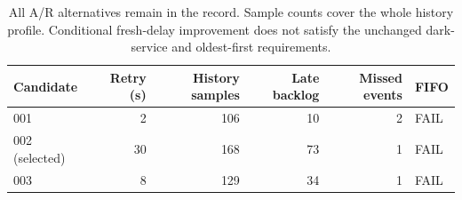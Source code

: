 \begin{table}[htbp]
\centering\small
\begin{tabular}{@{}lrrrrl@{}}
\toprule
Candidate & Retry (s) & History samples & Late backlog & Missed events & FIFO \\
\midrule
001 & 2 & 106 & 10 & 2 & FAIL \\
002 (selected) & 30 & 168 & 73 & 1 & FAIL \\
003 & 8 & 129 & 34 & 1 & FAIL \\
\bottomrule
\end{tabular}
\caption{All A/R alternatives remain in the record. Sample counts cover the whole history profile. Conditional fresh-delay improvement does not satisfy the unchanged dark-service and oldest-first requirements.}\label{tab:ar}
\end{table}
